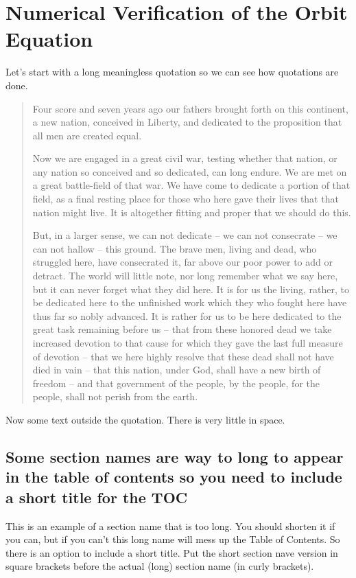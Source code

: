 \chapter{Numerical Verification of the Orbit Equation}
Let's start with a long meaningless quotation so we can see how quotations are done.

\begin{quotation}
Four score and seven years ago our fathers brought forth on this continent, a new nation, conceived in Liberty, and dedicated to the proposition that all men are created equal.

Now we are engaged in a great civil war, testing whether that nation, or any nation so conceived and so dedicated, can long endure. We are met on a great battle-field of that war. We have come to dedicate a portion of that field, as a final resting place for those who here gave their lives that that nation might live. It is altogether fitting and proper that we should do this.

But, in a larger sense, we can not dedicate -- we can not consecrate -- we can not hallow -- this ground. The brave men, living and dead, who struggled here, have consecrated it, far above our poor power to add or detract. The world will little note, nor long remember what we say here, but it can never forget what they did here. It is for us the living, rather, to be dedicated here to the unfinished work which they who fought here have thus far so nobly advanced. It is rather for us to be here dedicated to the great task remaining before us -- that from these honored dead we take increased devotion to that cause for which they gave the last full measure of devotion -- that we here highly resolve that these dead shall not have died in vain -- that this nation, under God, shall have a new birth of freedom -- and that government of the people, by the people, for the people, shall not perish from the earth.
\end{quotation}
Now some text outside the quotation. There is very little  in space.  
\section[Long Section Names]{Some section names are way to long to appear in the table of contents so you need to include a short title for the TOC}
This is an example of a section name that is too long.  You should shorten it if you can, but if you can't this long name will mess up the Table of Contents.  So there is an option to include a short title.  Put the short section nave version in square brackets before the actual (long) section name (in curly brackets).

